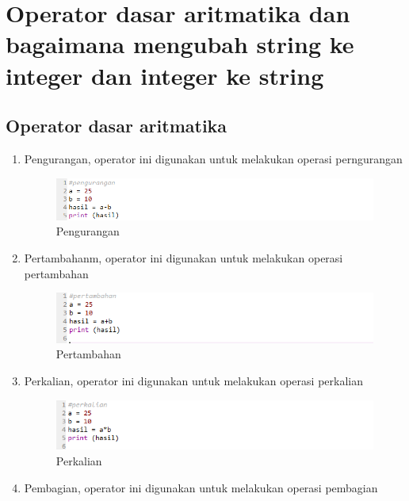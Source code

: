 \section{Operator dasar aritmatika dan bagaimana
mengubah string ke integer dan integer ke string}
\subsection{Operator dasar aritmatika}
\begin{enumerate}
    \item Pengurangan, operator ini digunakan untuk melakukan operasi perngurangan
        \begin{figure}[!htbp]
        \centering
        \includegraphics[width=15cm]{figures/pengurangan.PNG}
        \caption{Pengurangan}
        \label{}
    \end{figure}
    \item Pertambahanm, operator ini digunakan untuk melakukan operasi pertambahan
        \begin{figure}[!htbp]
        \centering
        \includegraphics[width=15cm]{figures/tambah.PNG}
        \caption{Pertambahan}
        \label{}
    \end{figure}
    \newpage
    \item Perkalian, operator ini digunakan untuk melakukan operasi perkalian
        \begin{figure}[!htbp]
        \centering
        \includegraphics[width=15cm]{figures/kali.PNG}
        \caption{Perkalian}
        \label{}
    \end{figure}
    \item Pembagian, operator ini digunakan untuk melakukan operasi pembagian
        \begin{figure}[!htbp]
        \centering

\end{figure}
\end{enumerate}

